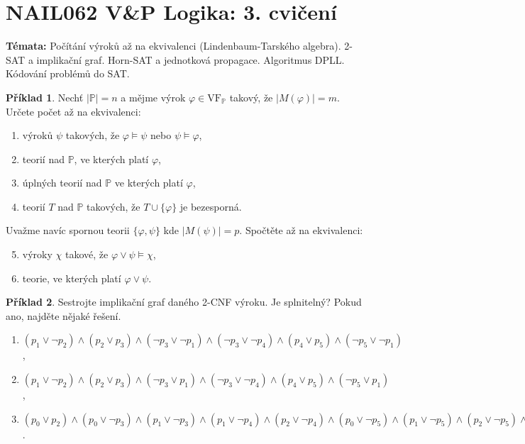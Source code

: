 \documentclass[a4paper]{article}
\theoremstyle{definition}
\newtheorem{problem}{Příklad}
\begin{document}
\section*{NAIL062 V\&P Logika: 3. cvičení}


\textbf{Témata:} 
Počítání výroků až na ekvivalenci (Lindenbaum-Tarského algebra). 2-SAT a implikační graf. Horn-SAT a jednotková propagace. Algoritmus DPLL. Kódování problémů do SAT.


\medskip\begin{problem}
    Nechť $|\mathbb{P}|=n$ a mějme výrok $\varphi\in\mathrm{VF}_{\mathbb{P}}$ takový, že $|M(\varphi)|=m$. Určete počet až na ekvivalenci:
    \begin{enumerate}
    \item výroků $\psi$ takových, že $\varphi \models \psi$ nebo $\psi \models \varphi$,
    \item teorií nad $\mathbb{P}$, ve kterých platí $\varphi$,
    \item úplných teorií nad $\mathbb{P}$ ve kterých platí $\varphi$,
    \item teorií $T$ nad $\mathbb{P}$ takových, že $T \cup \{\varphi\}$ je bezesporná.
    \end{enumerate}
    Uvažme navíc spornou teorii $\{\varphi,\psi\}$ kde $|M(\psi)|=p$. Spočtěte až na ekvivalenci:
    \begin{enumerate}
    \setcounter{enumi}{4}
    \item výroky $\chi$ takové, že $\varphi \vee \psi \models \chi$, 
    \item teorie, ve kterých platí $\varphi \vee \psi$.
    \end{enumerate}
\end{problem}

    
\medskip\begin{problem} Sestrojte implikační graf daného 2-CNF výroku. Je splnitelný? Pokud ano, najděte nějaké řešení.
\begin{enumerate}
    \item $(p_1\vee \neg p_2)\wedge (p_2\vee p_3)\wedge (\neg p_3\vee \neg p_1)\wedge (\neg p_3\vee \neg p_4)\wedge (p_4\vee p_5)\wedge (\neg p_5\vee \neg p_1)$,
    \item $(p_1\vee \neg p_2)\wedge (p_2\vee p_3)\wedge (\neg p_3\vee p_1)\wedge (\neg p_3\vee \neg p_4)\wedge (p_4\vee p_5)\wedge (\neg p_5\vee p_1)$,
    \item $(p_0 \vee  p_2) \wedge  (p_0 \vee  \neg p_3) \wedge  (p_1 \vee  \neg p_3) 
    \wedge  (p_1 \vee  \neg p_4) \wedge  (p_2 \vee  \neg p_4) 
    \wedge  (p_0 \vee  \neg p_5)
    \wedge 
    (p_1 \vee  \neg p_5) \wedge  (p_2 \vee  \neg p_5) \wedge  (\neg p_1 \vee  \neg p_6) \wedge  (p_4 \vee  p_6) \wedge  (p_5 \vee  p_6) \wedge  p_1\wedge \neg p_7$.
\end{enumerate}
\end{problem}
\end{document}
